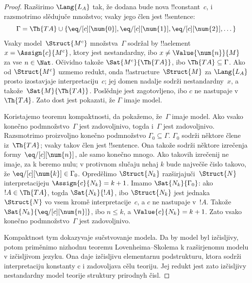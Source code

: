 \documentclass[../../../include/open-logic-section]{subfiles}
\begin{document}
\begin{proof}
Razširimo $\Lang{L_A}$ tak, že dodana bude nova !!{constant}~$c$, i
razsmotrimo slědujuče množstvo; vsaky jego člen jest !!{sentence}:
\[
\Gamma = \Th{TA} \cup \{\eq/[c][\num{0}], \eq/[c][\num{1}],
\eq/[c][\num{2}], \dots\}
\]
Vsaky model~$\Struct{M^c}$ množstva~$\Gamma$ sodržal by !!a{element}~$x =
\Assign{c}{M^c}$, ktory jest nestandardny, ibo $x \neq
\Value{\num{n}}{M}$ za vse $n \in \Nat$. Očividno takože
$\Sat{M^c}{\Th{TA}}$, ibo $\Th{TA} \subseteq \Gamma$. Ako od
$\Struct{M^c}$ uzmemo redukt, onda !!a{structure}~$\Struct{M}$ za $\Lang{L_A}$
prosto izostavjaje interpretaciju~$c$; jej domen nadalje sodrži
nestandardny~$x$, a takože~$\Sat{M}{\Th{TA}}$. Poslědnje jest
zagotovljeno, ibo $c$ ne nastupaje v~$\Th{TA}$. Zato dost jest
pokazati, že $\Gamma$ imaje model.

Koristajemo teoremu kompaktnosti, da pokažemo, že~$\Gamma$ imaje
model. Ako vsako konečno podmnožstvo~$\Gamma$
jest zadovoljnivo, togda i~$\Gamma$ jest zadovoljnivo. Razsmotrimo proizvoljno
konečno podmnožstvo $\Gamma_0 \subseteq
\Gamma$. $\Gamma_0$ sodrži něktore člene iz~$\Th{TA}$; vsaky takov člen
jest !!{sentence}. Ona takože sodrži něktore izrečenja
formy~$\eq/[c][\num{n}]$, ale samo konečno mnogo. Ako takovih
izrečenij ne imaje, za k beremo nulu; v protivnom slučaju nehaj $k$ bude
največše čislo takovo, že $\eq/[c][\num{k}] \in \Gamma_0$. Opredělimo
$\Struct{N_k}$ razširjajuči~$\Struct{N}$ interpretacijeju
$\Assign{c}{N_k} = k+1$. Imamo $\Sat{N_k}{\Gamma_0}$: ako $!A
\in \Th{TA}$, togda $\Sat{N_k}{!A}$, ibo $\Struct{N_k}$ jest
jednaka~$\Struct{N}$ vo vsem kromě interpretacije~$c$, a $c$ ne nastupaje
v~$!A$. Takože $\Sat{N_k}{\eq/[c][\num{n}]}$, ibo $n \le k$, a
$\Value{c}{N_k} = k+1$. Zato vsako konečno podmnožstvo~$\Gamma$ jest
zadovoljnivo.

Kompaktnost tym dokazyvaje sučstvovanje modela. Da by model byl
izčisljivy, potom priměnimo nizhodnu teoremu Lovenheima--Skolema
k razširjenomu modelu v izčisljivom jezyku. Ona daje izčisljivu
elementarnu podstrukturu, ktora sodrži interpretaciju konstanty c i
zadovoljava cělu teoriju. Jej redukt jest zato izčisljivy nestandardny
model teorije struktury prirodnyh čisl.
\end{proof}
\end{document}
